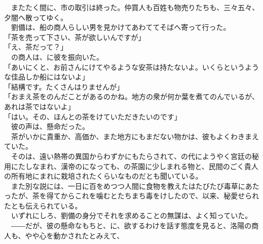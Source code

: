 \documentclass[
  paper=a5,
  fontsize=10pt,
  jafontsize=9.5pt,
  tate,                  %
  open_bracket_pos=nibu, %
]{jlreq}
\begin{document}
　またたく間に、市の取引は終った。仲買人も百姓も物売りたちも、三々五々、夕闇へ散ってゆく。\\


　劉備は、船の商人らしい男を見かけてあわててそばへ寄って行った。\\


「茶を売って下さい、茶が欲しいんですが」\\


「え、茶だって？」\\


　の商人は、に彼を振向いた。\\


「あいにくと、お前さんにけてやるような安茶は持たないよ。いくらというような佳品しか船にはないよ」\\


「結構です。たくさんはりませんが」\\


「おまえ茶をのんだことがあるのかね。地方の衆が何か葉を煮てのんでいるが、あれは茶ではないよ」\\


「はい。その、ほんとの茶をけていただきたいのです」\\


　彼の声は、懸命だった。\\


　茶がいかに貴重か、高価か、また地方にもまだない物かは、彼もよくわきまえていた。\\


　そのは、遠い熱帯の異国からわずかにもたらされて、の代にようやく宮廷の秘用にたしなまれ、漢帝のになっても、の茶園に少しまれる物と、民間のごく貴人の所有地にまれに栽培されたくらいなものだとも聞いている。\\


　また別な説には、一日に百をめつつ人間に食物を教えたはたびたび毒草にあたったが、茶を得てからこれを噛むとたちまち毒をけしたので、以来、秘愛せられたとも伝えられている。\\


　いずれにしろ、劉備の身分でそれを求めることの無謀は、よく知っていた。\\


　――だが、彼の懸命なもちと、に、欲するわけを話す態度を見ると、洛陽の商人も、やや心を動かされたとみえて、\\
\end{document}
